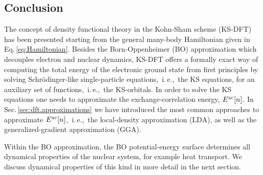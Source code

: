 \subsection{Conclusion}
The concept of density functional theory in the Kohn-Sham scheme (KS-DFT) has been presented starting from the general many-body Hamiltonian given in Eq.\,\eqref{eq:Hamiltonian}. Besides the Born-Oppenheimer (BO) approximation which decouples electron and nuclear dynamics, KS-DFT offers a formally exact way of computing the total energy of the electronic ground state from first principles by solving Schr\"odinger-like single-particle equations,~i.\,e.,~the KS equations, for an auxiliary set of functions,~i.\,e.,~the KS-orbitals. In order to solve the KS equations one needs to approximate the exchange-correlation energy, $E^{\rm xc} [n]$. In Sec.\,\ref{sec:dft.approximations} we have introduced the most common approaches to approximate $E^{\rm xc} [n]$,~i.\,e.,~the local-density approximation (LDA), as well as the generalized-gradient approximation (GGA).

Within the BO approximation, the BO potential-energy surface determines all dynamical properties of the nuclear system, for example heat transport. We discuss dynamical properties of this kind in more detail in the next section.